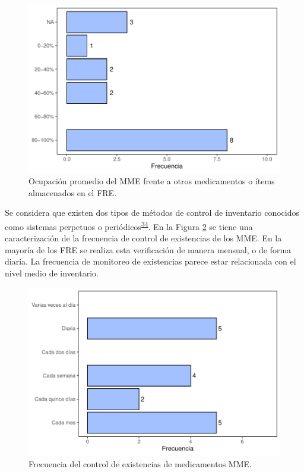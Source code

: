 \documentclass[
]{book}
\begin{document}
\begin{figure}[!b]

{\centering \includegraphics[width=0.85\linewidth]{InformeFinal_files/figure-latex/PropOcupacionAlmacen-1} 

}

\caption{Ocupación promedio del MME frente a otros medicamentos o ítems almacenados en el FRE.}\label{fig:PropOcupacionAlmacen}
\end{figure}

Se considera que existen dos tipos de métodos de control de inventario conocidos como sistemas perpetuos o periódicos\textsuperscript{\protect\hyperlink{ref-Silver2017}{34}}.
En la Figura \ref{fig:FrecControlExistencias} se tiene una caracterización de la frecuencia de control de existencias de los MME. En la mayoría de los FRE se realiza esta verificación de manera mensual, o de forma diaria. La frecuencia de monitoreo de existencias parece estar relacionada con el nivel medio de inventario.

\begin{figure}

{\centering \includegraphics[width=1\linewidth]{InformeFinal_files/figure-latex/FrecControlExistencias-1} 

}

\caption{Frecuencia del control de existencias de medicamentos MME.}\label{fig:FrecControlExistencias}
\end{figure}
\end{document}
